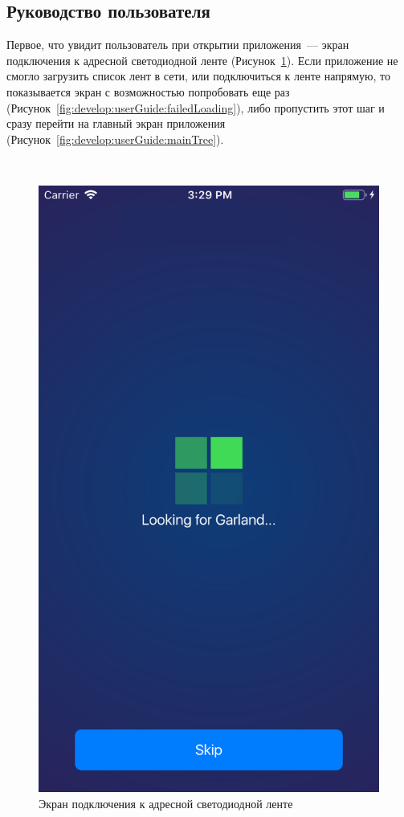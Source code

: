 \subsection{Руководство пользователя}
\label{sec:develop:userGuide}

Первое, что увидит пользователь при открытии приложения~--- экран подключения к адресной светодиодной ленте (Рисунок~\ref{fig:develop:userGuide:loading}). Если приложение не смогло загрузить список лент в сети, или подключиться к ленте напрямую, то показывается экран с возможностью попробовать еще раз (Рисунок~\ref{fig:develop:userGuide:failedLoading}), либо пропустить этот шаг и сразу перейти на главный экран приложения (Рисунок~\ref{fig:develop:userGuide:mainTree}).

~
\begin{figure}[H]
\centering
	\includegraphics[scale=0.2]{figures/userGuide/loading.png}
	\caption{Экран подключения к адресной светодиодной ленте}
	\label{fig:develop:userGuide:loading}
\end{figure}
